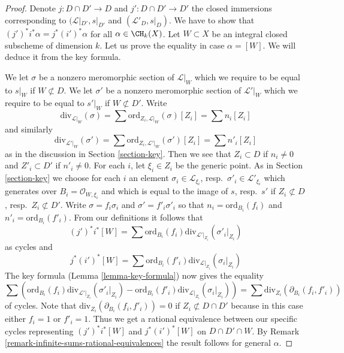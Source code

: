 \begin{proof}
Denote $j : D \cap D' \to D$ and $j' : D \cap D' \to D'$ the closed
immersions corresponding to $(\mathcal{L}|_{D'}, s|_{D'}$ and
$(\mathcal{L}'_D, s|_D)$. We have to show that
$(j')^*i^*\alpha = j^* (i')^*\alpha$ for all $\alpha \in \CH_k(X)$.
Let $W \subset X$ be an integral closed subscheme of dimension $k$.
Let us prove the equality in case $\alpha = [W]$. We will deduce
it from the key formula.

\medskip\noindent
We let $\sigma$ be a nonzero meromorphic section of $\mathcal{L}|_W$
which we require to be equal to $s|_W$ if $W \not \subset D$.
We let $\sigma'$ be a nonzero meromorphic section of $\mathcal{L}'|_W$
which we require to be equal to $s'|_W$ if $W \not \subset D'$.
Write
$$
\text{div}_{\mathcal{L}|_W}(\sigma) =
\sum \text{ord}_{Z_i, \mathcal{L}|_W}(\sigma)[Z_i] = \sum n_i[Z_i]
$$
and similarly
$$
\text{div}_{\mathcal{L}'|_W}(\sigma') =
\sum \text{ord}_{Z_i, \mathcal{L}'|_W}(\sigma')[Z_i] = \sum n'_i[Z_i]
$$
as in the discussion in Section \ref{section-key}.
Then we see that $Z_i \subset D$ if $n_i \not = 0$ and
$Z'_i \subset D'$ if $n'_i \not = 0$. For each $i$, let $\xi_i \in Z_i$
be the generic point. As in Section \ref{section-key} we choose
for each $i$ an element
$\sigma_i \in \mathcal{L}_{\xi_i}$, resp.\ $\sigma'_i \in \mathcal{L}'_{\xi_i}$
which generates over $B_i = \mathcal{O}_{W, \xi_i}$
and which is equal to the image of
$s$, resp.\ $s'$ if $Z_i \not \subset D$, resp.\ $Z_i \not \subset D'$.
Write $\sigma = f_i \sigma_i$ and $\sigma' = f'_i\sigma'_i$ so that
$n_i = \text{ord}_{B_i}(f_i)$ and
$n'_i = \text{ord}_{B_i}(f'_i)$.
From our definitions it follows that
$$
(j')^*i^*[W] =
\sum \text{ord}_{B_i}(f_i) \text{div}_{\mathcal{L}'|_{Z_i}}(\sigma'_i|_{Z_i})
$$
as cycles and
$$
j^*(i')^*[W] =
\sum \text{ord}_{B_i}(f'_i) \text{div}_{\mathcal{L}|_{Z_i}}(\sigma_i|_{Z_i})
$$
The key formula (Lemma \ref{lemma-key-formula}) now gives the equality
$$
\sum \left(
\text{ord}_{B_i}(f_i) \text{div}_{\mathcal{L}'|_{Z_i}}(\sigma'_i|_{Z_i}) -
\text{ord}_{B_i}(f'_i) \text{div}_{\mathcal{L}|_{Z_i}}(\sigma_i|_{Z_i})
\right) =
\sum \text{div}_{Z_i}(\partial_{B_i}(f_i, f'_i))
$$
of cycles. Note that $\text{div}_{Z_i}(\partial_{B_i}(f_i, f'_i)) = 0$ if
$Z_i \not \subset D \cap D'$ because in this case either $f_i = 1$
or $f'_i = 1$. Thus we get a rational equivalence between our specific
cycles representing $(j')^*i^*[W]$ and $j^*(i')^*[W]$ on $D \cap D' \cap W$.
By Remark \ref{remark-infinite-sums-rational-equivalences}
the result follows for general $\alpha$.
\end{proof}

















